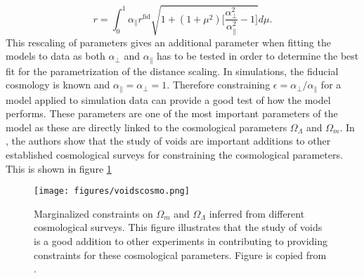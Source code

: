 \begin{equation}\label{eq:r_scaling}
    r=\int_0^1\alpha_\parallel r^{\mathrm{fid}}\sqrt{1+(1+\mu^2)\Big[\frac{\alpha_\perp^2}{\alpha_\parallel^2}-1\Big]}d\mu.
\end{equation}
This rescaling of parameters gives an additional parameter when fitting the models to data as both $\alpha_\perp$ and $\alpha_\parallel$ has to be tested in order to determine the best fit for the parametrization of the distance scaling. In simulations, the fiducial cosmology is known and $\alpha_\parallel=\alpha_\perp=1$. Therefore constraining $\epsilon=\alpha_\perp/\alpha_\parallel$ for a model applied to simulation data can provide a good test of how the model performs. These parameters are one of the most important parameters of the model as these are directly linked to the cosmological parameters $\Omega_\Lambda$ and $\Omega_m$. In \cite{Nadathur_2020}, the authors show that the study of voids are important additions to other established cosmological surveys for constraining the cosmological parameters. This is shown in figure \ref{fig:voidscosmoparam}
\begin{figure}
    \texttt{[image: figures/voidscosmo.png]}
    \caption{Marginalized constraints on $\Omega_m$ and $\Omega_\Lambda$ inferred from different cosmological surveys. This figure illustrates that the study of voids is a good addition to other experiments in contributing to providing constraints for these cosmological parameters. Figure is copied from \cite{Nadathur_2020}.}
    \label{fig:voidscosmoparam}
\end{figure}

